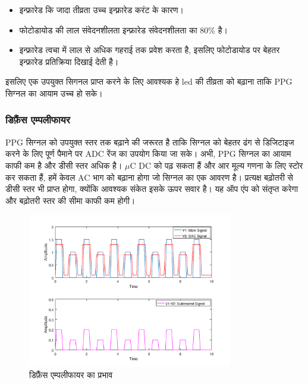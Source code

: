 			\begin{itemize}
				
				\item इन्फ्रारेड कि जादा तीव्रता उच्च इन्फ़्रारेड करंट के कारण।
				\item फोटोडायोड की लाल संवेदनशीलता इन्फ्रारेड संवेदनशीलता का 80\% है। 
				\item इन्फ्रारेड त्वचा में लाल से अधिक गहराई तक प्रवेश करता है, इसलिए फोटोडायोड पर बेहतर इन्फ्रारेड प्रतिक्रिया दिखाई देती है\cite{penetrate}। 
				
			\end{itemize}		
		
			इसलिए एक उपयुक्त सिगनल प्राप्त करने के लिए आवश्यक हे led की तीव्रता को बढ़ाना ताकि PPG सिग्नल का आयाम उच्च हो सके।	
			
		\subsubsection{डिफ़ैंस एम्पलीफायर}
		
			PPG सिग्नल को उपयुक्त स्तर तक बढ़ाने की जरूरत है ताकि सिग्नल को बेहतर ढंग से डिजिटाइज करने के लिए पूर्ण पैमाने पर ADC रेंज का उपयोग किया जा सके। अभी, PPG सिग्नल का आयाम काफी कम है और डीसी स्तर अधिक है। $\mu$C  DC को पढ़ सकता हैं और आर मूल्य गणना के लिए स्टोर कर सकता हैं, हमें केवल AC भाग को बढ़ाना होगा जो सिग्नल का एक आवरण है। प्रत्यक्ष बढ़ोतरी से डीसी स्तर भी प्राप्त होगा, क्योंकि आवश्यक संकेत इसके ऊपर सवार है। यह ऑप एंप को संतृप्त करेगा और बढ़ोतरी स्तर की सीमा काफी कम होगी।
		 
			
			\begin{figure}[ht!]
				\centering
				\includegraphics[width=0.8\textwidth]{../common/circuit/diff.png}
				\caption{डिफ़ैंस एम्पलीफायर का प्रभाव}
				\label{fig:diff}
			\end{figure}	
			
